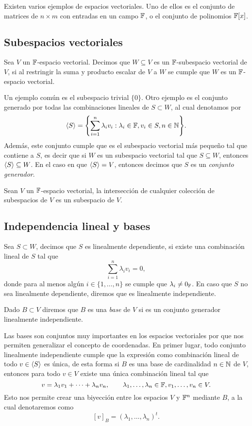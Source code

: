 Existen varios ejemplos de espacios vectoriales. Uno de ellos es el conjunto de matrices de $n \times m $ con entradas en un campo $\mathbb{F}$, o el conjunto de polinomios $\mathbb{F}[x]$.

\subsection{Subespacios vectoriales}

\begin{defi}
  Sea $V$ un $\mathbb{F}$-espacio vectorial. Decimos que $W \subseteq V$ es un $\mathbb{F}$-subespacio vectorial de $V$, si al restringir la suma y producto escalar de $V$ a $W$ se cumple que $W$ es un $\mathbb{F}$-espacio vectorial.
\end{defi}

Un ejemplo común es el subespacio trivial $\{0\}$. Otro ejemplo es el conjunto generado por todas las combinaciones lineales de $S \subset W$,  al cual denotamos por
\[ \inner{S} = \set{ \sum_{i=1}^n \lambda_i v_i : \lambda_i \in \F, v_i \in S, n \in \N }. \]
Además, este conjunto cumple que es el subespacio vectorial más pequeño tal que contiene a $S$, es decir que si $W$ es un subespacio vectorial tal que $S \subseteq W$, entonces $\langle S\rangle \subseteq W$. En el caso en que $\langle S\rangle = V$, entonces decimos que $S$ es un \emph{conjunto generador}.

\begin{teor}
  Sean $V$ un $\mathbb{F}$-espacio vectorial, la intersección de cualquier colección de subespacios de $V$ es un subespacio de $V$.
\end{teor}

\subsection{Independencia lineal y bases}

\begin{defi}
  Sea $S \subset W$, decimos que $S$ es linealmente dependiente, si existe una combinación lineal de $S$ tal que
  \[ \sum_{i=1}^n \lambda_i v_i = 0, \]
  donde para al menos algún $i \in \{1,\ldots,n\}$ se cumple que $\lambda_i \neq 0_{\mathbb{F}}$. En caso que $S$ no sea linealmente dependiente, diremos que es linealmente independiente.

  Dado $B \subset V$ diremos que $B$ es una \emph{base} de $V$ si es un conjunto generador linealmente independiente.
\end{defi}

Las bases son conjuntos muy importantes en los espacios vectoriales por que nos permiten generalizar el concepto de coordenadas. En primer lugar, todo conjunto linealmente independiente cumple que la expresión como combinación lineal de todo $v \in \langle S\rangle$ es única, de esta forma si $B$ es una base de cardinalidad $n \in \mathbb{N}$ de $V$, entonces para todo $v \in V$ existe una única combinación lineal tal que 
\[ v = \lambda_1 v_1 + \cdots + \lambda_n v_n, \qquad \lambda_1,\ldots,\lambda_n \in \mathbb{F}, v_1,\ldots,v_n \in V. \]
Esto nos permite crear una biyección entre los espacios $V$ y $\mathbb{F}^n$ mediante $B$, a la cual denotaremos como
\[ [v]_B = (\lambda_1, \ldots, \lambda_n)^t.\]

